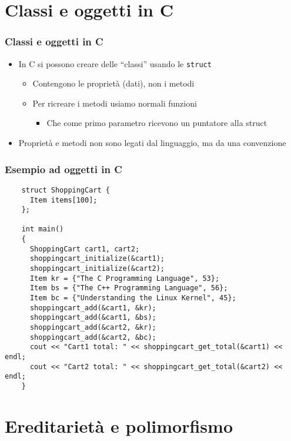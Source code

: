 \documentclass[xetex,table]{beamer}
\begin{document}
\section{Classi e oggetti in C}

\begin{frame}
  \frametitle{Classi e oggetti in C}
  \begin{itemize}
  \item In C si possono creare delle ``classi'' usando le \texttt{struct}
    \begin{itemize}
    \item Contengono le proprietà (dati), non i metodi
    \item Per ricreare i metodi usiamo normali funzioni
      \begin{itemize}
      \item Che come primo parametro ricevono un puntatore alla struct
      \end{itemize}
    \end{itemize}
    \item Proprietà e metodi non sono legati dal linguaggio, ma da una
      convenzione
  \end{itemize}
\end{frame}

\begin{frame}[fragile]
  \frametitle{Esempio ad oggetti in C}
  \begin{verbatim}
    struct ShoppingCart {
      Item items[100];
    };

    int main()
    {
      ShoppingCart cart1, cart2;
      shoppingcart_initialize(&cart1);
      shoppingcart_initialize(&cart2);
      Item kr = {"The C Programming Language", 53};
      Item bs = {"The C++ Programming Language", 56};
      Item bc = {"Understanding the Linux Kernel", 45};
      shoppingcart_add(&cart1, &kr);
      shoppingcart_add(&cart1, &bs);
      shoppingcart_add(&cart2, &kr);
      shoppingcart_add(&cart2, &bc);
      cout << "Cart1 total: " << shoppingcart_get_total(&cart1) << endl;
      cout << "Cart2 total: " << shoppingcart_get_total(&cart2) << endl;
    }
  \end{verbatim}
\end{frame}

\section{Ereditarietà e polimorfismo}
\end{document}
